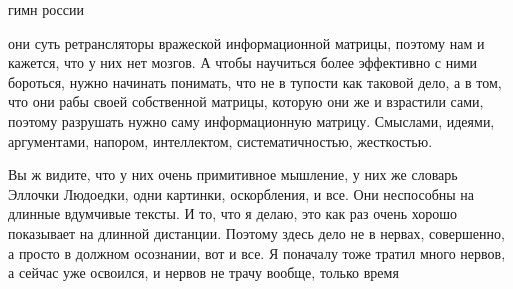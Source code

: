  
 
 
 
 

\Large



гимн россии

они суть ретрансляторы вражеской информационной матрицы, поэтому нам и кажется,
что у них нет мозгов. А чтобы научиться более эффективно с ними бороться, нужно
начинать понимать, что не в тупости как таковой дело, а в том, что они рабы
своей собственной матрицы, которую они же и взрастили сами, поэтому разрушать
нужно саму информационную матрицу. Смыслами, идеями, аргументами, напором,
интеллектом, систематичностью, жесткостью.

Вы ж видите, что у них очень примитивное мышление, у них же словарь Эллочки
Людоедки, одни картинки, оскорбления, и все. Они неспособны на длинные
вдумчивые тексты. И то, что я делаю, это как раз очень хорошо показывает на
длинной дистанции. Поэтому здесь дело не в нервах, совершенно, а просто в
должном осознании, вот и все. Я поначалу тоже тратил много нервов, а сейчас уже
освоился, и нервов не трачу вообще, только время


